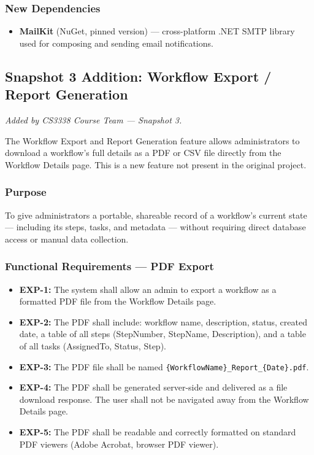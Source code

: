 \documentclass[12pt]{article}
\begin{document}
\subsubsection{New Dependencies}
\begin{itemize}
    \item \textbf{MailKit} (NuGet, pinned version) --- cross-platform .NET SMTP library
    used for composing and sending email notifications.
\end{itemize}

\subsection{Snapshot 3 Addition: Workflow Export / Report Generation}
\textit{Added by CS3338 Course Team --- Snapshot 3.}

The Workflow Export and Report Generation feature allows administrators to download a
workflow's full details as a PDF or CSV file directly from the Workflow Details page. This
is a new feature not present in the original project.

\subsubsection{Purpose}
To give administrators a portable, shareable record of a workflow's current state ---
including its steps, tasks, and metadata --- without requiring direct database access or
manual data collection.

\subsubsection{Functional Requirements --- PDF Export}
\begin{itemize}
    \item \textbf{EXP-1:} The system shall allow an admin to export a workflow as a
    formatted PDF file from the Workflow Details page.
    \item \textbf{EXP-2:} The PDF shall include: workflow name, description, status,
    created date, a table of all steps (StepNumber, StepName, Description), and a table
    of all tasks (AssignedTo, Status, Step).
    \item \textbf{EXP-3:} The PDF file shall be named
    \texttt{\{WorkflowName\}\_Report\_\{Date\}.pdf}.
    \item \textbf{EXP-4:} The PDF shall be generated server-side and delivered as a
    file download response. The user shall not be navigated away from the Workflow Details
    page.
    \item \textbf{EXP-5:} The PDF shall be readable and correctly formatted on standard
    PDF viewers (Adobe Acrobat, browser PDF viewer).
\end{itemize}
\end{document}
